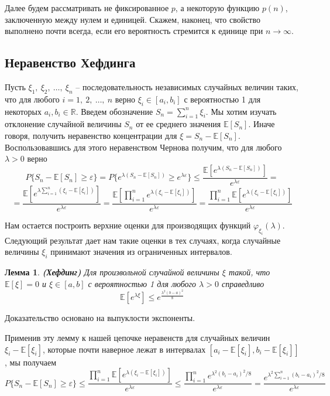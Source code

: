 \documentclass[a4paper]{article}
\newtheorem{mlemma}{Лемма}[section]
\begin{document}
Далее будем рассматривать не фиксированное $p$, а некоторую функцию $p(n)$, заключенную между нулем и единицей. 
Скажем, наконец, что свойство выполнено почти всегда, если его вероятность стремится к единице при $n \rightarrow \infty$.

\subsection{Неравенство Хефдинга}

Пусть $\xi_1,\ \xi_2,\ \dots,\ \xi_n$ -- последовательность независимых случайных величин таких, что 
для любого $i = 1,\ 2,\ \ldots,\ n$ верно $\xi_i \in [a_i, b_i]$ с вероятностью 1 для некоторых 
$a_i, b_i \in \mathbb{R}$. Введем обозначение $S_n = \sum\limits_{i = 1}^n\xi_i$. Мы хотим изучать 
отклонение случайной величины $S_n$ от ее среднего значения $\mathbb{E}[S_n]$. Иначе говоря, получить неравенство 
концентрации для $\xi = S_n - \mathbb{E}[S_n]$. Воспользовавшись для этого неравенством Чернова получим, что 
для любого $\lambda > 0$ верно $$P\{S_n - \mathbb{E}[S_n] \geq \varepsilon\} = P\{e^{\lambda(S_n - 
\mathbb{E}[S_n])} \geq e^{\lambda\varepsilon}\} \leq \frac{\mathbb{E}[e^{\lambda(S_n - \mathbb{E}[S_n])}]}{e^{\lambda\varepsilon}} = $$
$$ = \frac{\mathbb{E}[e^{\lambda\sum\limits_{i=1}^n(\xi_i - \mathbb{E}[\xi_i])}]}{e^{\lambda\varepsilon}} = 
\frac{\mathbb{E}[\prod\limits_{i=1}^ne^{\lambda(\xi_i - \mathbb{E}[\xi_i])}]}{e^{\lambda\varepsilon}} = 
\frac{\prod\limits_{i=1}^n\mathbb{E}[e^{\lambda(\xi_i - \mathbb{E}[\xi_i])}]}{e^{\lambda\varepsilon}}$$

Нам остается построить верхние оценки для производящих функций $\varphi_{\xi_i}(\lambda)$. Следующий 
результат дает нам такие оценки в тех случаях, когда случайные величины $\xi_i$ принимают значения 
из ограниченных интервалов.

\begin{mlemma}\emph{\textbf{(Хефдинг)}}
    Для произвольной случайной величины $\xi$ такой, что $\mathbb{E}[\xi] = 0$ и $\xi \in [a, b]$ с вероятностью 1 
    для любого $\lambda > 0$ справедливо $$\mathbb{E}[e^{\lambda\xi}] \leq e^{\frac{\lambda^2(b-a)^2}{8}}$$
\end{mlemma}

Доказательство основано на выпуклости экспоненты.

Применив эту лемму к нашей цепочке неравенств для случайных величин $\xi_i - \mathbb{E}[\xi_i]$, которые
почти наверное лежат в интервалах $[a_i - \mathbb{E}[\xi_i], b_i - \mathbb{E}[\xi_i]]$, мы получаем 
$$P\{S_n - \mathbb{E}[S_n] \geq \varepsilon\} \leq \frac{\prod\limits_{i=1}^n\mathbb{E}[e^{\lambda(\xi_i - \mathbb{E}[\xi_i])}]}{e^{\lambda\varepsilon}} \leq 
 \frac{\prod\limits_{i=1}^ne^{\lambda^2(b_i-a_i)^2/8}}{e^{\lambda\varepsilon}} = \frac{e^{\lambda^2\sum\limits_{i=1}^n(b_i-a_i)^2/8}}{e^{\lambda\varepsilon}}$$
\end{document}
